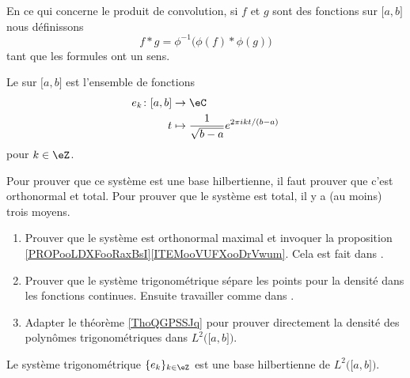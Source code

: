 \begin{definition}
	En ce qui concerne le produit de convolution, si \( f\) et \( g\) sont des fonctions sur \( \mathopen\lbrack a , b \mathclose]\) nous définissons
	\begin{equation}
		f*g=\phi^{-1}\big( \phi(f)*\phi(g) \big)
	\end{equation}
	tant que les formules ont un sens.
\end{definition}

\begin{definition}
	Le  sur \( \mathopen[ a , b \mathclose]\) est l'ensemble de fonctions
	\begin{equation}
		\begin{aligned}
			e_k\colon \mathopen[ a , b \mathclose] & \to \eC                                               \\
			t                                      & \mapsto  \frac{1}{ \sqrt{ b-a } } e^{2\pi i kt/(b-a)}
		\end{aligned}
	\end{equation}
	pour \( k\in \eZ\).
\end{definition}

\begin{normaltext}
	Pour prouver que ce système est une base hilbertienne, il faut prouver que c'est orthonormal et total. Pour prouver que le système est total, il y a (au moins) trois moyens.
	\begin{enumerate}
		\item
		      Prouver que le système est orthonormal maximal et invoquer la proposition \ref{PROPooLDXFooRaxBsI}\ref{ITEMooVUFXooDrVwum}. Cela est fait dans \cite{BIBooZYKMooGGbwyI}.
		\item
		      Prouver que le système trigonométrique sépare les points pour la densité dans les fonctions continues. Ensuite travailler comme dans \cite{BIBooQLKHooOlskCs}.
		\item
		      Adapter le théorème \ref{ThoQGPSSJq} pour prouver directement la densité des polynômes trigonométriques dans \( L^2\big( \mathopen[ a , b \mathclose] \big)\).
	\end{enumerate}
\end{normaltext}

\begin{theorem}       \label{THOooAVWIooDhnjpN}
	Le système trigonométrique \( \{ e_k \}_{k\in \eZ}\) est une base hilbertienne de \( L^2\big( \mathopen[ a , b \mathclose] \big)\).
\end{theorem}

